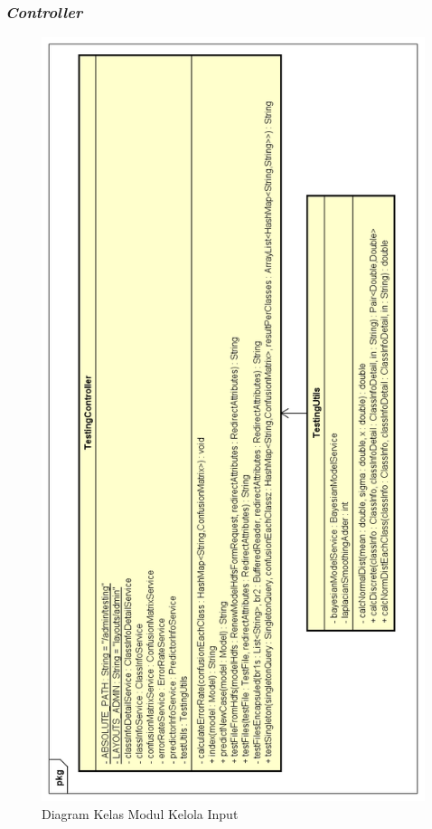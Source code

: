 \subsubsection{\textit{Controller}}
\begin{figure}[H]
	\centering
	\includegraphics[scale=0.6]{ClassDiagramLengkap/Klasifikasi/Simple_CD_Klasifikasi_Controller_Utils}
	\caption[Diagram Kelas Modul Kelola Input]{Diagram Kelas Modul Kelola Input}
	\label{fig:Diagram Kelas Modul Kelola Input}
\end{figure}

